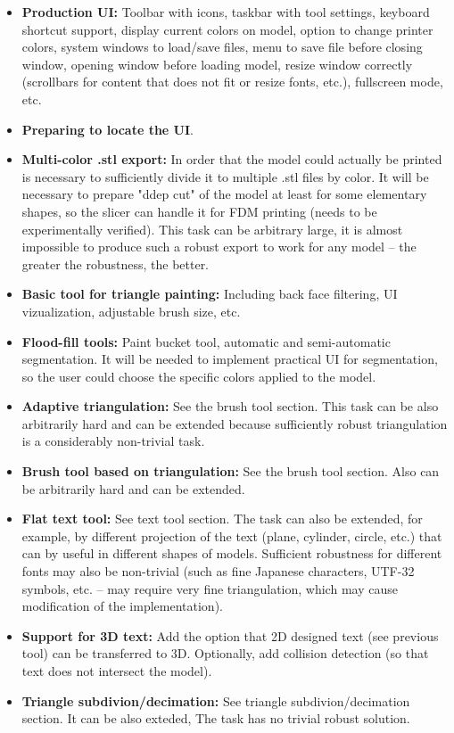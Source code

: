 \begin{itemize}
\item \textbf{Production UI:} Toolbar with icons, taskbar with tool settings, keyboard shortcut support, display current colors on model, option to change printer colors, system windows to load/save files, menu to save file before closing window, opening window before loading model, resize window correctly (scrollbars for content that does not fit or resize fonts, etc.), fullscreen mode, etc.
\item \textbf{Preparing to locate the UI}.
\item \textbf{Multi-color .stl export:} In order that the model could actually be printed is necessary to sufficiently divide it to multiple .stl files by color. It will be necessary to prepare "ddep cut" of the model at least for some elementary shapes, so the slicer can handle it for FDM printing (needs to be experimentally verified).  This task can be arbitrary large, it is almost impossible to produce such a robust export to work for any model -- the greater the robustness, the better.
\item \textbf{Basic tool for triangle painting:} Including back face filtering, UI vizualization, adjustable brush size, etc.
\item \textbf{Flood-fill tools:} Paint bucket tool, automatic and semi-automatic segmentation. It will be needed to implement practical UI for segmentation, so the user could choose the specific colors applied to the model.
\item \textbf{Adaptive triangulation:} See the brush tool section.  This task can be also arbitrarily hard and can be extended because sufficiently robust triangulation is a considerably non-trivial task.
\item \textbf{Brush tool based on triangulation:} See the brush tool section. Also can be arbitrarily hard and can be extended.
\item \textbf{Flat text tool:} See text tool section. The task can also be extended, for example, by different projection of the text (plane, cylinder, circle, etc.) that can by useful in different shapes of models.  Sufficient robustness for different fonts may also be non-trivial (such as fine Japanese characters, UTF-32 symbols, etc. -- may require very fine triangulation, which may cause modification of the implementation).
\item \textbf{Support for 3D text:} Add the option that 2D designed text (see previous tool) can be transferred to 3D. Optionally, add collision detection (so that text does not intersect the model).
\item \textbf{Triangle subdivion/decimation:} See triangle subdivion/decimation section. It can be also exteded, The task has no trivial robust solution.
\end{itemize}



